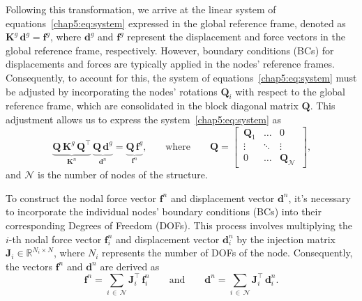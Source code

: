 Following this transformation, we arrive at the linear system of equations~\eqref{chap5:eq:system} expressed in the global reference frame, denoted as $\mathbf{K}^{g} \, \mathbf{d}^{g} = \mathbf{f}^{g}$, where $\mathbf{d}^{g}$ and $\mathbf{f}^{g}$ represent the displacement and force vectors in the global reference frame, respectively. However, boundary conditions (\acp{BC}) for displacements and forces are typically applied in the nodes' reference frames. Consequently, to account for this, the system of equations~\eqref{chap5:eq:system} must be adjusted by incorporating the nodes' rotations $\mathbf{Q}_{i}$ with respect to the global reference frame, which are consolidated in the block diagonal matrix $\mathbf{Q}$. This adjustment allows us to express the system~\eqref{chap5:eq:system} as
%
\begin{equation}
  \underbrace{\mathbf{Q} \, \mathbf{K}^{g} \, \mathbf{Q}^\top}_{\displaystyle\mathbf{K}^{n}} \, \underbrace{\mathbf{Q} \, \mathbf{d}^{g}}_{\displaystyle\mathbf{d}^{n}} = \underbrace{\mathbf{Q} \, \mathbf{f}^{g}}_{\displaystyle\mathbf{f}^{n}} \text{,} \qquad \text{where} \qquad \mathbf{Q} = \left[\,\begin{matrix}
    \mathbf{Q}_{1} & \ldots & 0 \\[0.25em]
    \vdots       & \ddots & \vdots \\[0.25em]
    0            & \ldots & \mathbf{Q}_{\mathcal{N}}
  \end{matrix}\,\right] \text{,}
\end{equation}
%
and $\mathcal{N}$ is the number of nodes of the structure.

To construct the nodal force vector $\mathbf{f}^{n}$ and displacement vector $\mathbf{d}^{n}$, it's necessary to incorporate the individual nodes' boundary conditions (\acp{BC}) into their corresponding Degrees of Freedom (\acp{DOF}). This process involves multiplying the $i$-th nodal force vector $\mathbf{f}^{n}_{i}$ and displacement vector $\mathbf{d}^{n}_{i}$ by the injection matrix $\mathbf{J}_{i} \in \mathbb{R}^{N_i \times N}$, where $N_i$ represents the number of \acp{DOF} of the node. Consequently, the vectors $\mathbf{f}^{n}$ and $\mathbf{d}^{n}$ are derived as
%
\begin{equation}
  \mathbf{f}^{n} = \sum_{i \, \in \, \mathcal{N}} \mathbf{J}_{i}^\top \, \mathbf{f}^{n}_{i}
  \qquad \text{and} \qquad
  \mathbf{d}^{n} = \sum_{i \, \in \, \mathcal{N}} \mathbf{J}_{i}^\top \, \mathbf{d}^{n}_{i} \text{.}
\end{equation}

